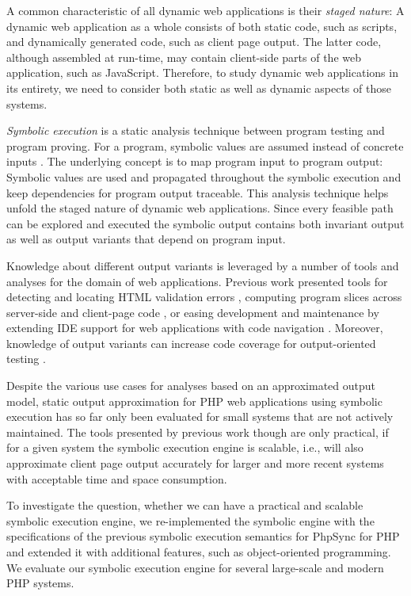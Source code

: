 \documentclass[sigconf]{acmart}
\renewcommand{\sf}[1]{\textsf{#1}}
\begin{document}
A common characteristic of all dynamic web applications is their
\emph{staged nature}: A dynamic web application as a whole
consists of both static code, such as scripts, and dynamically generated code,
such as client page output. The latter code, although assembled at
run-time, may contain client-side parts of the web application, such as
JavaScript. Therefore, to study dynamic web applications in its entirety, we
need to consider both static as well as dynamic aspects of those systems.

\emph{Symbolic execution} is a static analysis technique between program testing
and program proving. For a program, symbolic values are
assumed instead of concrete inputs \cite{Darringer1978,King1976}. The underlying
concept is to map program input to program output: Symbolic values are used and
propagated throughout the symbolic execution and keep dependencies for program
output traceable. This analysis technique helps unfold the staged nature
of dynamic web applications. Since every feasible path can be explored
and executed the symbolic output contains both invariant output as well as
output variants that depend on program input.

Knowledge about different output variants is leveraged by a number of
tools and analyses for the domain of web applications. Previous work presented
tools for detecting and locating HTML validation errors
\cite{Nguyen:2011:AFH:2190078.2190142}, computing program slices across
server-side and client-page code \cite{Nguyen:2015:CPS:2786805.2786872}, or
easing development and maintenance by extending IDE support for web applications
with code navigation \cite{Nguyen:2015:VIS:2819009.2819140,Nguyen:2014:BCG:2635868.2635928}.
Moreover, knowledge of output variants can increase code coverage for
output-oriented testing \cite{Alshahwan2011}.

Despite the various use cases for analyses based on an approximated output
model, static output approximation for PHP web applications using symbolic
execution has so far only been evaluated for small systems that are not
actively maintained. The tools presented by previous work
\cite{Nguyen:2015:VIS:2819009.2819140,Nguyen:2014:BCG:2635868.2635928,Nguyen:2015:CPS:2786805.2786872,Nguyen:2011:AFH:2190078.2190142}
though are only practical, if for a given system the symbolic execution engine
is scalable, i.e., will also approximate client page output accurately for
larger and more recent systems with acceptable time and space consumption.

To investigate the question, whether we can have a practical and scalable
symbolic execution engine, we re-implemented the symbolic engine with the
specifications of the previous symbolic execution semantics
for \sf{PhpSync} \cite{Nguyen:2014:BCG:2635868.2635928} for PHP and
extended it with additional features, such as object-oriented programming. We
evaluate our symbolic execution engine for several large-scale and modern PHP systems.
\end{document}
